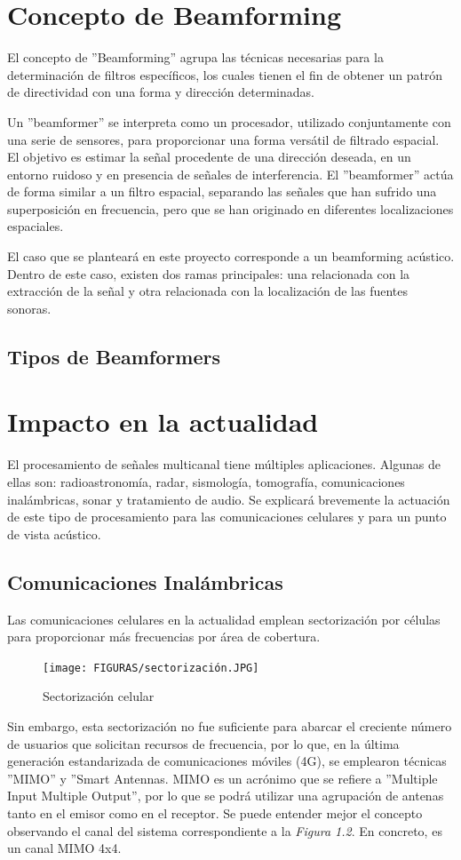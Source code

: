 \documentclass[a4paper,11pt]{book}
\begin{document}
	\section{Concepto de Beamforming}
	El concepto de ''Beamforming'' agrupa las técnicas necesarias para la determinación de filtros específicos, los cuales tienen el fin de obtener un patrón de directividad con una forma y dirección determinadas.
	
	Un ''beamformer'' se interpreta como un procesador, utilizado conjuntamente con una serie de sensores, para proporcionar una forma versátil de filtrado espacial. El objetivo es estimar la señal procedente de una dirección deseada, en un entorno ruidoso y en presencia de señales de interferencia. El ''beamformer'' actúa de forma similar a un filtro espacial, separando las señales que han sufrido una superposición en frecuencia, pero que se han originado en diferentes localizaciones espaciales.
	
	El caso que se planteará en este proyecto corresponde a un beamforming acústico. Dentro de este caso, existen dos ramas principales: una relacionada con la extracción de la señal y otra relacionada con la localización de las fuentes sonoras.
		\subsection{Tipos de Beamformers}
	\section{Impacto en la actualidad}
	El procesamiento de señales multicanal tiene múltiples aplicaciones. Algunas de ellas son: radioastronomía, radar, sismología, tomografía, comunicaciones inalámbricas, sonar y tratamiento de audio. Se explicará brevemente la actuación de este tipo de procesamiento para las comunicaciones celulares y para un punto de vista acústico.
		\subsection{Comunicaciones Inalámbricas}
		Las comunicaciones celulares en la actualidad emplean sectorización por células para proporcionar más frecuencias por área de cobertura.
		\begin{figure}[hbtp]
		\centering
		\texttt{[image: FIGURAS/sectorización.JPG]}
		\caption{Sectorización celular}
		\end{figure}
		
	
	Sin embargo, esta sectorización no fue suficiente para abarcar el creciente número de usuarios que solicitan recursos de frecuencia, por lo que, en la última generación estandarizada de comunicaciones móviles (4G), se emplearon técnicas ''MIMO'' y ''Smart Antennas. MIMO es un acrónimo que se refiere a ''Multiple Input Multiple Output'', por lo que se podrá utilizar una agrupación de antenas tanto en el emisor como en el receptor. Se puede entender mejor el concepto observando el canal del sistema correspondiente a la \textit{Figura 1.2}. En concreto, es un canal MIMO 4x4.
		
\end{document}
